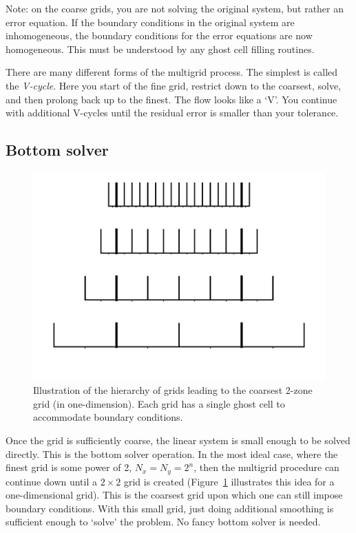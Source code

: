Note: on the coarse grids, you are not solving the original system,
but rather an error equation.  If the boundary conditions in the
original system are inhomogeneous, the boundary conditions for the
error equations are now homogeneous.  This must be understood by
any ghost cell filling routines.

There are many different forms of the multigrid process.  The simplest 
is called the {\em V-cycle}.  Here you start of the fine grid, restrict
down to the coarsest, solve, and then prolong back up to the finest. 
The flow looks like a `V'.  You continue with additional V-cycles
until the residual error is smaller than your tolerance.



\subsection{Bottom solver}

\begin{figure}[t]
\centering
\includegraphics[width=\linewidth]{mgtower}
\caption[A multigrid hierarchy]{\label{fig:mgtower} Illustration of
  the hierarchy of grids leading to the coarsest 2-zone grid (in
  one-dimension).  Each grid has a single ghost cell to accommodate
  boundary conditions.}
\end{figure}

Once the grid is sufficiently coarse, the linear system is small
enough to be solved directly.  This is the bottom solver operation.
In the most ideal case, where the finest grid is some power of 2, $N_x
= N_y = 2^n$, then the multigrid procedure can continue down until a
$2\times 2$ grid is created (Figure~\ref{fig:mgtower} illustrates this idea
for a one-dimensional grid).  This is the coarsest grid upon which one
can still impose boundary conditions.  With this small grid, just
doing additional smoothing is sufficient enough to `solve' the
problem.  No fancy bottom solver is needed.

